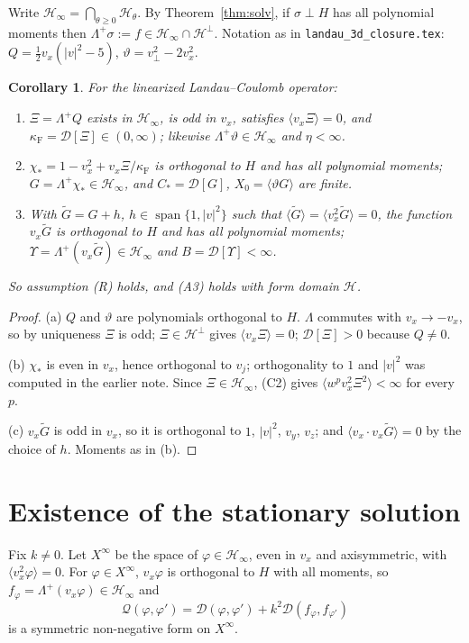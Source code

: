 \documentclass[11pt]{article}
\newcommand{\cD}{\mathcal{D}}
\newcommand{\cH}{\mathcal{H}}
\newcommand{\cQ}{\mathcal{Q}}
\newcommand{\avg}[1]{\langle #1\rangle}
\newtheorem{corollary}[theorem]{Corollary}
\theoremstyle{remark}
\begin{document}
Write $\cH_\infty=\bigcap_{\theta\ge0}\cH_\theta$. By
Theorem~\ref{thm:solv}, if $\sigma\perp H$ has all polynomial moments then
$\Lambda^+\sigma:=f\in\cH_\infty\cap\cH^\perp$. Notation as in
\texttt{landau\_3d\_closure.tex}: $Q=\tfrac12v_x(|v|^2-5)$,
$\vartheta=v_\perp^2-2v_x^2$.

\begin{corollary}\label{cor:R}
For the linearized Landau--Coulomb operator:
\begin{enumerate}
  \item[(a)] $\Xi=\Lambda^+Q$ exists in $\cH_\infty$, is odd in $v_x$,
    satisfies $\avg{v_x\Xi}=0$, and
    $\kappa_{\mathrm F}=\cD[\Xi]\in(0,\infty)$; likewise
    $\Lambda^+\vartheta\in\cH_\infty$ and $\eta<\infty$.
  \item[(b)] $\chi_*=1-v_x^2+v_x\Xi/\kappa_{\mathrm F}$ is orthogonal to $H$
    and has all polynomial moments; $G=\Lambda^+\chi_*\in\cH_\infty$, and
    $C_*=\cD[G]$, $X_0=\avg{\vartheta G}$ are finite.
  \item[(c)] With $\tilde G=G+h$, $h\in\operatorname{span}\{1,|v|^2\}$ such
    that $\avg{\tilde G}=\avg{v_x^2\tilde G}=0$, the function $v_x\tilde G$ is
    orthogonal to $H$ and has all polynomial moments;
    $\Upsilon=\Lambda^+(v_x\tilde G)\in\cH_\infty$ and $B=\cD[\Upsilon]<\infty$.
\end{enumerate}
So assumption (R) holds, and (A3) holds with form domain $\cH$.
\end{corollary}

\begin{proof}
(a) $Q$ and $\vartheta$ are polynomials orthogonal to $H$. $\Lambda$
commutes with $v_x\to-v_x$, so by uniqueness $\Xi$ is odd;
$\Xi\in\cH^\perp$ gives $\avg{v_x\Xi}=0$; $\cD[\Xi]>0$ because $Q\ne0$.

(b) $\chi_*$ is even in $v_x$, hence orthogonal to $v_j$; orthogonality to
$1$ and $|v|^2$ was computed in the earlier note. Since $\Xi\in\cH_\infty$,
(C2) gives $\avg{w^{p}v_x^2\Xi^2}<\infty$ for every $p$.

(c) $v_x\tilde G$ is odd in $v_x$, so it is orthogonal to $1$, $|v|^2$,
$v_y$, $v_z$; and $\avg{v_x\cdot v_x\tilde G}=0$ by the choice of $h$.
Moments as in (b).
\end{proof}

\section{Existence of the stationary solution}

Fix $k\ne0$. Let $X^\infty$ be the space of $\varphi\in\cH_\infty$, even in
$v_x$ and axisymmetric, with $\avg{v_x^2\varphi}=0$. For
$\varphi\in X^\infty$, $v_x\varphi$ is orthogonal to $H$ with all moments, so
$f_\varphi=\Lambda^+(v_x\varphi)\in\cH_\infty$ and
\[
  \cQ(\varphi,\varphi')=\cD(\varphi,\varphi')+k^2\cD(f_\varphi,f_{\varphi'})
\]
is a symmetric non-negative form on $X^\infty$.
\end{document}
